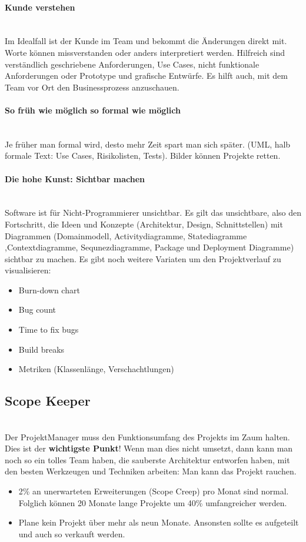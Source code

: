 \paragraph{Kunde verstehen} \hfill \\
Im Idealfall ist der Kunde im Team und bekommt die Änderungen direkt mit. Worte können missverstanden oder anders interpretiert werden. Hilfreich sind verständlich geschriebene Anforderungen, Use Cases, nicht funktionale Anforderungen oder Prototype und grafische Entwürfe. Es hilft auch, mit dem Team vor Ort den Businessprozess anzuschauen.

\paragraph{So früh wie möglich so formal wie möglich} \hfill \\
Je früher man formal wird, desto mehr Zeit spart man sich später. (UML, halb formale Text: Use Cases, Risikolisten, Tests). Bilder können Projekte retten.

\paragraph{Die hohe Kunst: Sichtbar machen} \hfill \\
Software ist für Nicht-Programmierer unsichtbar. Es gilt das unsichtbare, also den Fortschritt, die Ideen und Konzepte (Architektur, Design, Schnittstellen) mit Diagrammen (Domainmodell, Activitydiagramme, Statediagramme ,Contextdiagramme, Sequnezdiagramme, Package und Deployment Diagramme) sichtbar zu machen. Es gibt noch weitere Variaten um den Projektverlauf zu visualisieren:
\begin{itemize}
	\item Burn-down chart
	\item Bug count
	\item Time to fix bugs
	\item Build breaks
	\item Metriken (Klassenlänge, Verschachtlungen)
\end{itemize}

\subsection{Scope Keeper} \hfill \\
Der ProjektManager muss den Funktionsumfang des Projekts im Zaum halten. Dies ist der \textbf{wichtigste Punkt}! Wenn man dies nicht umsetzt, dann kann man noch so ein tolles Team haben, die sauberste Architektur entworfen haben, mit den besten Werkzeugen und Techniken arbeiten: Man kann das Projekt rauchen.
\begin{itemize}
	\item 2\% an unerwarteten Erweiterungen (Scope Creep) pro Monat sind normal. Folglich können 20 Monate lange Projekte um 40\% umfangreicher werden. 
	\item Plane kein Projekt über mehr als neun Monate. Ansonsten sollte es aufgeteilt und auch so verkauft werden.
\end{itemize}


